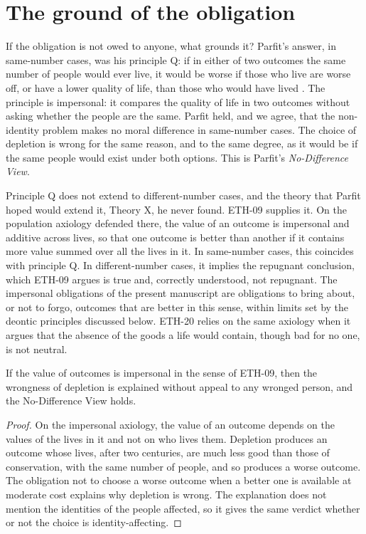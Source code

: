 \documentclass{situationist-preprint}
\begin{document}
\section{The ground of the obligation}\label{s:ground}

If the obligation is not owed to anyone, what grounds it? Parfit's answer, in same-number cases, was his principle Q: if in either of two outcomes the same number of people would ever live, it would be worse if those who live are worse off, or have a lower quality of life, than those who would have lived \citep[Part Four]{Parfit1984}. The principle is impersonal: it compares the quality of life in two outcomes without asking whether the people are the same. Parfit held, and we agree, that the non-identity problem makes no moral difference in same-number cases. The choice of depletion is wrong for the same reason, and to the same degree, as it would be if the same people would exist under both options. This is Parfit's \emph{No-Difference View}.

Principle Q does not extend to different-number cases, and the theory that Parfit hoped would extend it, Theory X, he never found. ETH-09 supplies it. On the population axiology defended there, the value of an outcome is impersonal and additive across lives, so that one outcome is better than another if it contains more value summed over all the lives in it. In same-number cases, this coincides with principle Q. In different-number cases, it implies the repugnant conclusion, which ETH-09 argues is true and, correctly understood, not repugnant. The impersonal obligations of the present manuscript are obligations to bring about, or not to forgo, outcomes that are better in this sense, within limits set by the deontic principles discussed below. ETH-20 relies on the same axiology when it argues that the absence of the goods a life would contain, though bad for no one, is not neutral.

\begin{proposition}\label{p:ground}
If the value of outcomes is impersonal in the sense of ETH-09, then the wrongness of depletion is explained without appeal to any wronged person, and the No-Difference View holds.
\end{proposition}

\begin{proof}
On the impersonal axiology, the value of an outcome depends on the values of the lives in it and not on who lives them. Depletion produces an outcome whose lives, after two centuries, are much less good than those of conservation, with the same number of people, and so produces a worse outcome. The obligation not to choose a worse outcome when a better one is available at moderate cost explains why depletion is wrong. The explanation does not mention the identities of the people affected, so it gives the same verdict whether or not the choice is identity-affecting.
\end{proof}
\end{document}

